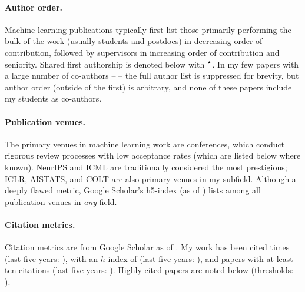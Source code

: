 \documentclass[10pt]{article}
\begin{document}
\paragraph{Author order.} Machine learning publications typically first list those primarily performing the bulk of the work (usually students and postdocs) in decreasing order of contribution,
followed by supervisors in increasing order of contribution and seniority.
Shared first authorship is denoted below with $^{\boldsymbol\star}$.
In my few papers with a large number of co-authors -- \lotsoauths{} -- the full author list is suppressed for brevity,
but author order (outside of the first) is arbitrary, and none of these papers include my students as co-authors.

\paragraph{Publication venues.} The primary venues in machine learning work are conferences,
which conduct rigorous review processes with low acceptance rates (which are listed below where known).
NeurIPS and ICML are traditionally considered the most prestigious;
ICLR, AISTATS, and COLT are also primary venues in my subfield.
Although a deeply flawed metric, Google Scholar's h5-index (as of \citeupdatedate{}) lists \hfiveinfo{} among all publication venues in \emph{any} field.

\paragraph{Citation metrics.}
Citation metrics are from Google Scholar as of \citeupdatedate{}.
My work has been cited \totalcites{} times (last five years: \totalcitesrec{}),
with an $h$-index of \hindex{} (last five years: \hindexrec{}),
and \itenindex{} papers with at least ten citations (last five years: \itenindexrec{}).
Highly-cited papers are noted below (thresholds: \citethreshes).

\end{document}
